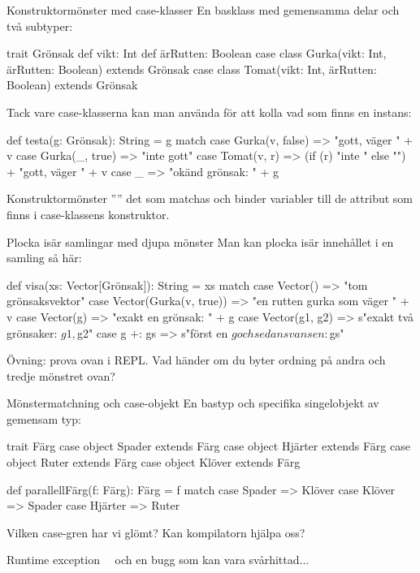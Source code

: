 \begin{Slide}{Konstruktormönster med case-klasser}\SlideFontSmall
En basklass med gemensamma delar och två subtyper:
\begin{Code}
trait Grönsak {
  def vikt: Int
  def ärRutten: Boolean
}
case class Gurka(vikt: Int, ärRutten: Boolean) extends Grönsak
case class Tomat(vikt: Int, ärRutten: Boolean) extends Grönsak
\end{Code}
\pause
Tack vare case-klasserna kan man använda   för att kolla vad som finns  en instans:
\begin{Code}
def testa(g: Grönsak): String = g match {
  case Gurka(v, false) => "gott, väger " + v
  case Gurka(_, true)  => "inte gott"
  case Tomat(v, r)     => (if (r) "inte " else "") + "gott, väger " + v
  case _ => "okänd grönsak: " + g
}
\end{Code}

Konstruktormönster '''' det som matchas och binder variabler till de attribut som finns i case-klassens konstruktor.
\end{Slide}


\begin{Slide}{Plocka isär samlingar med djupa mönster}
Man kan plocka isär innehållet i en samling så här:
\begin{Code}
def visa(xs: Vector[Grönsak]): String = xs match {
  case Vector()               => "tom grönsaksvektor"
  case Vector(Gurka(v, true)) => "en rutten gurka som väger " + v
  case Vector(g)              => "exakt en grönsak: " + g
  case Vector(g1, g2)         => s"exakt två grönsaker: $g1, $g2"
  case g +: gs                => s"först en $g och sedan svansen: $gs"
}
\end{Code}
Övning: prova ovan i REPL. Vad händer om du byter ordning på andra och tredje mönstret ovan?
\end{Slide}

\begin{Slide}{Mönstermatchning och case-objekt}
En bastyp och specifika singelobjekt av gemensam typ:
\begin{Code}
trait Färg
case object Spader  extends Färg
case object Hjärter extends Färg
case object Ruter   extends Färg
case object Klöver  extends Färg

def parallellFärg(f: Färg): Färg = f match {
  case Spader  => Klöver
  case Klöver  => Spader
  case Hjärter => Ruter
}
\end{Code}
Vilken case-gren har vi glömt? Kan kompilatorn hjälpa oss?
\pause
{}
Runtime exception \code{:(} ~~och en bugg som kan vara svårhittad...
\end{Slide}

